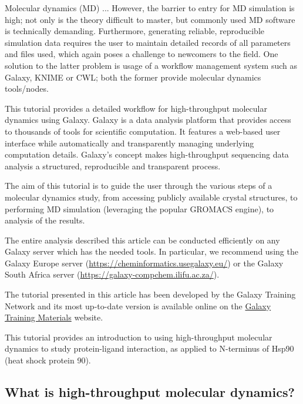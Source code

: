 \documentclass[twocolumn]{bmcart}%
\begin{document}
Molecular dynamics (MD) ... However, the barrier to entry for MD simulation is high; not only is the theory difficult to master, but commonly used MD software is technically demanding. Furthermore, generating reliable, reproducible simulation data requires the user to maintain detailed records of all parameters and files used, which again poses a challenge to newcomers to the field. One solution to the latter problem is usage of a workflow management system such as Galaxy, KNIME or CWL; both the former provide molecular dynamics tools/nodes.

This tutorial provides a detailed workflow for high-throughput molecular dynamics using Galaxy. Galaxy
\cite{afgan_galaxy_2018} is a data analysis platform that provides access to thousands of tools for scientific computation. It features a web-based user interface while automatically and transparently managing underlying computation details. Galaxy's
concept makes high-throughput sequencing data analysis a structured, reproducible and transparent process.

The aim of this tutorial is to guide the user through the various steps of a molecular dynamics study, from accessing publicly available crystal structures, to performing MD simulation (leveraging the popular GROMACS engine), to analysis of the results.

The entire analysis described this article can be conducted efficiently on any Galaxy server which has the needed tools. In particular, we recommend using the Galaxy Europe server
(\url{https://cheminformatics.usegalaxy.eu/}) or the Galaxy South Africa server (\url{https://galaxy-compchem.ilifu.ac.za/}).

The tutorial presented in this article has been developed by the Galaxy Training Network \cite{batut2018community} and its most up-to-date
version is available online on the \href{https://training.galaxyproject.org/topics/computational-chemistry/tutorials/htmd-analysis/tutorial.html}{Galaxy Training Materials} website.

This tutorial provides an introduction to using high-throughput
molecular dynamics to study protein-ligand interaction, as applied to
N-terminus of Hsp90 (heat shock protein 90).

\subsection*{What is high-throughput molecular
dynamics?}\label{what-is-high-throughput-molecular-dynamics}
\end{document}
